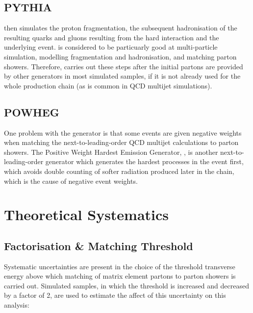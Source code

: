 \subsection{PYTHIA}
\label{ss:pythia}
\PYTHIA \cite{pythia8} then simulates the proton fragmentation, the subsequent hadronisation of the
resulting quarks and gluons resulting from the hard interaction and the underlying event. \PYTHIA is
considered to be particuarly good at multi-particle simulation, modelling fragmentation and hadronisation, and
matching parton showers. Therefore, \PYTHIA carries out these steps after the initial partons are provided
by other generators in most simulated samples, if it is not already used for the whole production chain (as is
common in QCD multijet simulations).

\subsection{POWHEG}
\label{ss:powheg}
One problem with the \MCATNLO generator is that some events are given negative weights when matching
the next-to-leading-order QCD multijet calculations to parton showers.  The Positive Weight Hardest Emission
Generator, \POWHEG \cite{powheg_Frixione, powheg_Nason, powheg_Alioli}, is another next-to-leading-order
generator which generates the hardest processes in the event first, which avoids double counting of
softer radiation produced later in the chain, which is the cause of negative event weights.


\section{Theoretical Systematics}
\label{s:Theoretical Systematics}
\subsection{Factorisation \& Matching Threshold}
\label{ss:factorisation_and_matching_threshold}
Systematic uncertainties are present in the choice of the threshold transverse energy above which matching of
matrix element partons to parton showers is carried out. Simulated samples, in which the threshold is
increased and decreased by a factor of 2, are used to estimate the affect of this uncertainty on this
analysis:

